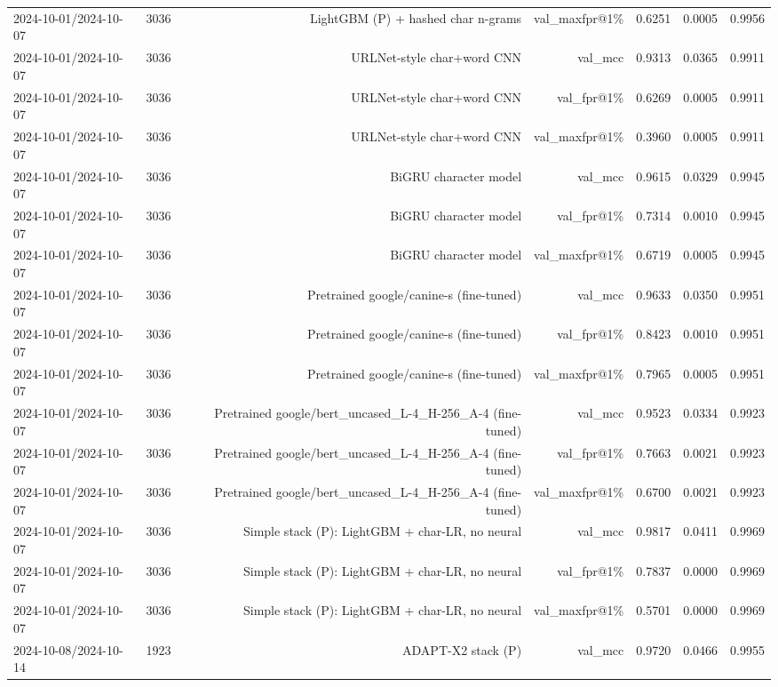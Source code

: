 \begin{table}[t]
\begin{tabular}{llrrrrr}
2024-10-01/2024-10-07 & 3036 & LightGBM (P) + hashed char n-grams & val\_maxfpr@1\% & 0.6251 & 0.0005 & 0.9956 \\
2024-10-01/2024-10-07 & 3036 & URLNet-style char+word CNN & val\_mcc & 0.9313 & 0.0365 & 0.9911 \\
2024-10-01/2024-10-07 & 3036 & URLNet-style char+word CNN & val\_fpr@1\% & 0.6269 & 0.0005 & 0.9911 \\
2024-10-01/2024-10-07 & 3036 & URLNet-style char+word CNN & val\_maxfpr@1\% & 0.3960 & 0.0005 & 0.9911 \\
2024-10-01/2024-10-07 & 3036 & BiGRU character model & val\_mcc & 0.9615 & 0.0329 & 0.9945 \\
2024-10-01/2024-10-07 & 3036 & BiGRU character model & val\_fpr@1\% & 0.7314 & 0.0010 & 0.9945 \\
2024-10-01/2024-10-07 & 3036 & BiGRU character model & val\_maxfpr@1\% & 0.6719 & 0.0005 & 0.9945 \\
2024-10-01/2024-10-07 & 3036 & Pretrained google/canine-s (fine-tuned) & val\_mcc & 0.9633 & 0.0350 & 0.9951 \\
2024-10-01/2024-10-07 & 3036 & Pretrained google/canine-s (fine-tuned) & val\_fpr@1\% & 0.8423 & 0.0010 & 0.9951 \\
2024-10-01/2024-10-07 & 3036 & Pretrained google/canine-s (fine-tuned) & val\_maxfpr@1\% & 0.7965 & 0.0005 & 0.9951 \\
2024-10-01/2024-10-07 & 3036 & Pretrained google/bert\_uncased\_L-4\_H-256\_A-4 (fine-tuned) & val\_mcc & 0.9523 & 0.0334 & 0.9923 \\
2024-10-01/2024-10-07 & 3036 & Pretrained google/bert\_uncased\_L-4\_H-256\_A-4 (fine-tuned) & val\_fpr@1\% & 0.7663 & 0.0021 & 0.9923 \\
2024-10-01/2024-10-07 & 3036 & Pretrained google/bert\_uncased\_L-4\_H-256\_A-4 (fine-tuned) & val\_maxfpr@1\% & 0.6700 & 0.0021 & 0.9923 \\
2024-10-01/2024-10-07 & 3036 & Simple stack (P): LightGBM + char-LR, no neural & val\_mcc & 0.9817 & 0.0411 & 0.9969 \\
2024-10-01/2024-10-07 & 3036 & Simple stack (P): LightGBM + char-LR, no neural & val\_fpr@1\% & 0.7837 & 0.0000 & 0.9969 \\
2024-10-01/2024-10-07 & 3036 & Simple stack (P): LightGBM + char-LR, no neural & val\_maxfpr@1\% & 0.5701 & 0.0000 & 0.9969 \\
2024-10-08/2024-10-14 & 1923 & ADAPT-X2 stack (P) & val\_mcc & 0.9720 & 0.0466 & 0.9955 \\

\end{tabular}
\end{table}
